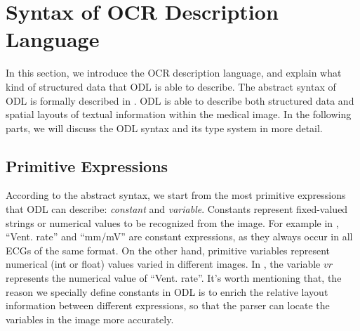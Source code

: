 \section{Syntax of OCR Description Language}
\label{sec:syntax}

In this section, we introduce the OCR description language,
and explain what kind of structured data that ODL is able to describe.
The abstract syntax of ODL is formally described in .
ODL is able to describe both structured data and
spatial layouts of textual information within the medical image.
In the following parts, we will discuss the ODL syntax and its type system in more detail.



\subsection{Primitive Expressions}
According to the abstract syntax, we start from the most primitive expressions
that ODL can describe: \textit{constant} and \textit{variable}.
Constants represent fixed-valued strings or numerical values to be recognized from the image.
For example in , ``Vent. rate'' and ``mm/mV''
are constant expressions, as they always occur in all ECGs of the same format.
On the other hand, primitive variables represent numerical (int or float) values
varied in different images.
In , the variable $vr$ represents the
numerical value of ``Vent. rate''.%
It's worth mentioning that,
the reason we specially define constants in ODL is to
enrich the relative layout information between different expressions,
so that the parser can locate the variables in the image more accurately.


